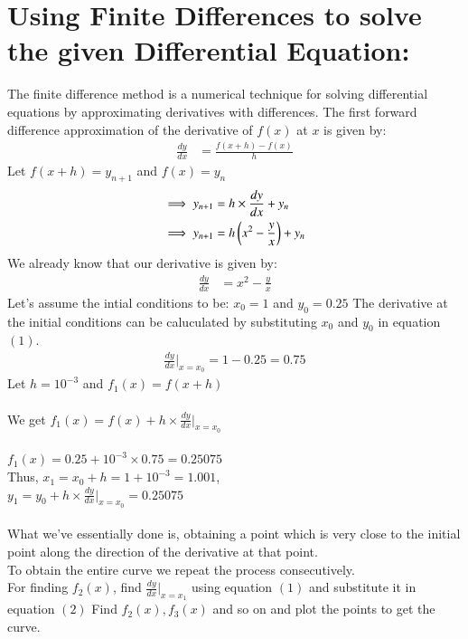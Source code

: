 \documentclass[journal]{IEEEtran}
\begin{document}
\section*{Using Finite Differences to solve the given Differential Equation: }
The finite difference method is a numerical technique for solving differential equations by approximating derivatives with differences.
The first forward difference approximation of the derivative of $f(x)$ at $x$ is given by:
\begin{align}
    \frac{dy}{dx}&=\frac{f(x+h)-f(x)}{h}
\end{align}
Let $f(x+h)=y_{n+1}$ and $f(x)=y_n$
\begin{align}
    \implies y_{n+1}&=h\times\frac{dy}{dx}+y_n\\
    \implies y_{n+1}&=h\left(x^2-\frac{y}{x}\right)+y_n
\end{align}
We already know that our derivative is given by:
\begin{align}
\frac{dy}{dx}&=x^2-\frac{y}{x}
\end{align}
Let's assume the intial conditions to be: $x_0=1$ and $y_0=0.25$
The derivative at the initial conditions can be caluculated by substituting $x_0$ and $y_0$ in equation $(1)$.\\
\begin{align}
\frac{dy}{dx}|_{x=x_0}=1-0.25 =0.75
\end{align}
Let $h=10^{-3}$ and $f_1(x)=f(x+h)$\\\\
We get $f_1(x)=f(x)+h\times\frac{dy}{dx}|_{x=x_0} $\\\\
$f_1(x)=0.25+10^{-3}\times0.75=0.25075$\\
Thus, $x_1=x_0+h=1+10^{-3}=1.001$,\\$y_1=y_0+h\times\frac{dy}{dx}|_{x=x_0}=0.25075$\\\\
What we've essentially done is, obtaining a point which is very close to the initial point along the direction of the derivative at that point.\\To obtain the entire curve we repeat the process consecutively.\\For finding $f_2(x)$, find $\frac{dy}{dx}|_{x=x_1}$ using equation $(1)$ and substitute it in equation $(2)$ Find $f_2(x), f_3(x)$ and so on and plot the points to get the curve.
\end{document}
